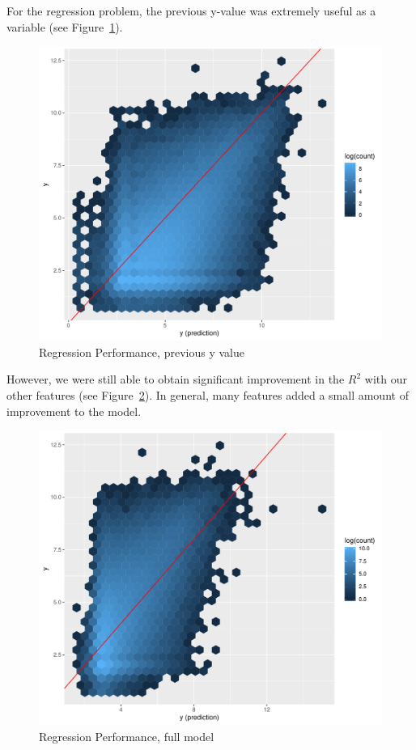\documentclass[letterpaper, 12pt, conference]{ieeeconf}
\begin{document}
For the regression problem, the previous y-value was extremely useful as a variable (see Figure~\ref{fig:yprev}).
\begin{figure}[ht]
    \centering
    \includegraphics[width=1\linewidth]{prev_vs_target.pdf}
    \caption{Regression Performance, previous y value}
    \label{fig:yprev}
\end{figure}
However, we were still able to obtain significant improvement in the $R^2$ with our other features (see Figure~\ref{fig:yreg}). In general, many features added a small amount of improvement to the model.
\begin{figure}[ht]
    \centering
    \includegraphics[width=1\linewidth]{reg_vs_target.pdf}
    \caption{Regression Performance, full model}
    \label{fig:yreg}
\end{figure}
\end{document}
